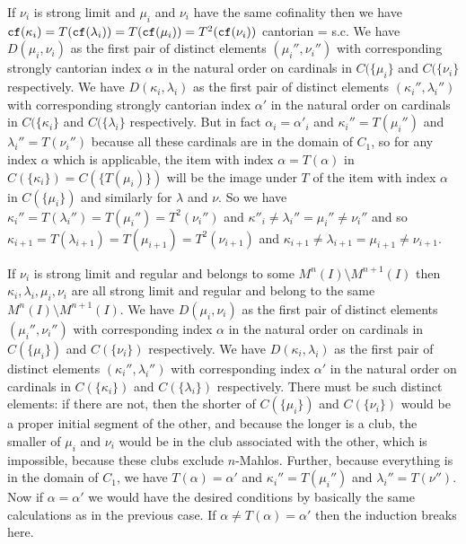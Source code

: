 \documentclass[12pt]{article}
\begin{document}
If $\nu_i$ is strong limit and $\mu_i$ and $\nu_i$ have the same cofinality then we have ${\tt cf}(\kappa_i) = T({\tt cf}(\lambda_i)) = T({\tt cf}(\mu_i)) = T^2({\tt cf}(\nu_i))$ cantorian = s.c.  We have $D(\mu_i,\nu_i)$ as the first pair of distinct elements $(\mu_i'',\nu_i'')$ with corresponding strongly cantorian index $\alpha$ in the natural order on cardinals in $C(\{\mu_i\}$ and $C(\{\nu_i\}$ respectively.  We have $D(\kappa_i,\lambda_i)$ as the first pair of distinct elements $(\kappa_i'',\lambda_i'')$ with corresponding strongly cantorian index $\alpha'$ in the natural order on cardinals in $C(\{\kappa_i\}$ and $C(\{\lambda_i\}$ respectively.  But in fact $\alpha_i = \alpha'_i$ and $\kappa_i''=T(\mu_i'')$ and $\lambda_i''=T(\nu_i'')$
because all these cardinals are in the domain of $C_1$, so for any index $\alpha$ which is applicable, the item with index $\alpha = T(\alpha)$ in $C(\{\kappa_i\}) = C(\{T(\mu_i)\})$ will be the image under $T$ of the item with index $\alpha$ in $C(\{\mu_i\})$ and similarly for $\lambda$ and $\nu$.  So we have $\kappa_i''=T(\lambda_i'') = T(\mu_i'') = T^2(\nu_i'')$ and $\kappa''_i \neq \lambda_i'' = \mu_i'' \neq \nu_i''$ and so $\kappa_{i+1}=T(\lambda_{i+1}) = T(\mu_{i+1}) = T^2(\nu_{i+1})$ and $\kappa_{i+1} \neq \lambda_{i+1}= \mu_{i+1} \neq \nu_{i+1}$.

If $\nu_i$ is strong limit and regular and belongs to some $M^n(I) \setminus M^{n+1}(I)$ then $\kappa_i,\lambda_i,\mu_i,\nu_i$ are all strong limit and regular and belong to the same $M^n(I) \setminus M^{n+1}(I)$.  We have $D(\mu_i,\nu_i)$ as the first pair of distinct elements $(\mu_i'',\nu_i'')$ with corresponding  index $\alpha$ in the natural order on cardinals in $C(\{\mu_i\})$ and $C(\{\nu_i\})$ respectively.  We have $D(\kappa_i,\lambda_i)$ as the first pair of distinct elements $(\kappa_i'',\lambda_i'')$ with corresponding  index $\alpha'$ in the natural order on cardinals in $C(\{\kappa_i\})$ and $C(\{\lambda_i\})$ respectively.  There must be such distinct elements:  if there are not, then the shorter of $C(\{\mu_i\})$ and $C(\{\nu_i\})$
would be a proper initial segment of the other, and because the longer is a club, the smaller of $\mu_i$ and $\nu_i$ would be in the club associated with the other, which is impossible, because these clubs exclude $n$-Mahlos.  Further, because
everything is in the domain of $C_1$, we have $T(\alpha) = \alpha'$ and $\kappa_i'' = T(\mu_i'')$ and $\lambda_i''=T(\nu'')$.  Now if  $\alpha = \alpha'$ we would have the desired conditions by basically the same calculations as in the previous case.
If $\alpha \neq T(\alpha) = \alpha'$ then the induction breaks here.
\end{document}
